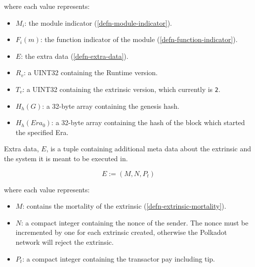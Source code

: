 \begin{definition}
    where each value represents:
    \begin{itemize}
        \item $M_i$: the module indicator (\ref{defn-module-indicator}).
        \item $F_i(m)$: the function indicator of the module (\ref{defn-function-indicator}).
        \item $E$: the extra data (\ref{defn-extra-data}).
        \item $R_v$: a UINT32 containing the Runtime version.
        \item $T_v$: a UINT32 containing the extrinsic version, which currently is \verb|2|.
        \item $H_h(G)$: a 32-byte array containing the genesis hash.
        \item $H_h(Era_0)$: a 32-byte array containing the hash of the block which started the specified Era.
    \end{itemize}
\end{definition}

\begin{definition}
    \label{defn-extra-data}
    Extra data, $E$, is a tuple containing additional meta data about the
    extrinsic and the system it is meant to be executed in.

    \[
        E := (M, N, P_t)
    \]

    where each value represents:
    \begin{itemize}
        \item $M$: contains the mortality of the extrinsic (\ref{defn-extrinsic-mortality}).
        \item $N$: a compact integer containing the nonce of the sender. The
        nonce must be incremented by one for each extrinsic created, otherwise
        the Polkadot network will reject the extrinsic.
        \item $P_t$: a compact integer containing the transactor pay including tip.
    \end{itemize}

\end{definition}


